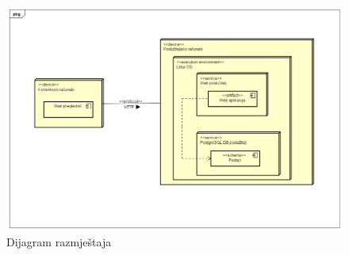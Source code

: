			 \begin{figure}[H]
			 	\includegraphics[width=1\linewidth]{slike/Dijagram_razmjestaja.PNG} %
			 	\caption{Dijagram razmještaja}
			 	\label{fig:dijraz} %
			 \end{figure}
			
			\eject 
		
